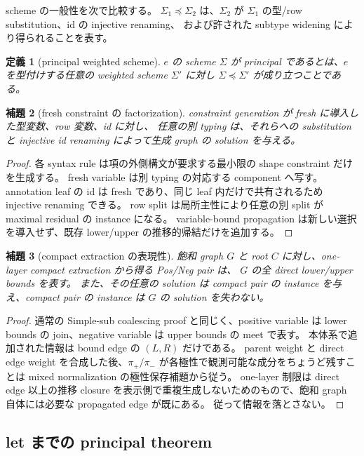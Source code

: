\documentclass[uplatex,dvipdfmx,a4paper,10.5pt]{jsarticle}
\theoremstyle{jpplain}
\newtheorem{definition}{定義}[section]
\newtheorem{lemma}[definition]{補題}
\newcommand{\projp}{\pi_{+}}
\newcommand{\projn}{\pi_{-}}
\begin{document}
scheme の一般性を次で比較する。
$\Sigma_1\preceq\Sigma_2$ は、$\Sigma_2$ が $\Sigma_1$ の型/row substitution、id の injective renaming、
および許された subtype widening により得られることを表す。

\begin{definition}[principal weighted scheme]
$e$ の scheme $\Sigma$ が principal であるとは、$e$ を型付けする任意の weighted scheme $\Sigma'$ に対し
$\Sigma\preceq\Sigma'$ が成り立つことである。
\end{definition}

\begin{lemma}[fresh constraint の factorization]
constraint generation が fresh に導入した型変数、row 変数、id に対し、
任意の別 typing は、それらへの substitution と injective id renaming によって生成 graph の solution を与える。
\end{lemma}

\begin{proof}
各 syntax rule は項の外側構文が要求する最小限の shape constraint だけを生成する。
fresh variable は別 typing の対応する component へ写す。
annotation leaf の id は fresh であり、同じ leaf 内だけで共有されるため injective renaming できる。
row split は局所主性により任意の別 split が maximal residual の instance になる。
variable-bound propagation は新しい選択を導入せず、既存 lower/upper の推移的帰結だけを追加する。
\end{proof}

\begin{lemma}[compact extraction の表現性]
飽和 graph $G$ と root $C$ に対し、one-layer compact extraction から得る Pos/Neg pair は、
$G$ の全 direct lower/upper bounds を表す。
また、その任意の solution は compact pair の instance を与え、compact pair の instance は $G$ の solution を失わない。
\end{lemma}

\begin{proof}
通常の Simple-sub coalescing proof と同じく、positive variable は lower bounds の join、negative variable は upper bounds の meet で表す。
本体系で追加された情報は bound edge の $(L,R)$ だけである。
parent weight と direct edge weight を合成した後、$\projp/\projn$ が各極性で観測可能な成分をちょうど残すことは mixed normalization の極性保存補題から従う。
one-layer 制限は direct edge 以上の推移 closure を表示側で重複生成しないためのもので、飽和 graph 自体には必要な propagated edge が既にある。
従って情報を落とさない。
\end{proof}

\subsection{let までの principal theorem}
\end{document}
